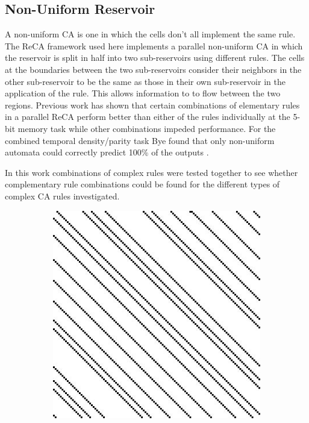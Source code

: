 \documentclass{elsarticle}
\begin{document}
\begin{multicols}{2}
\subsection{Non-Uniform Reservoir}
A non-uniform CA is one in which the cells don't all implement the same rule.  
    The ReCA framework used here implements a parallel non-uniform CA in which 
    the reservoir is split in half into two sub-reservoirs  using different 
    rules.  The cells at the boundaries between  the two sub-reservoirs 
    consider their neighbors in the other sub-reservoir to be the same as those 
    in their own sub-reservoir in the application of the rule. This allows 
    information to to flow between the two regions. Previous work has shown 
    that certain combinations of elementary rules in a parallel ReCA perform 
    better than either of the rules individually at the 5-bit memory task while 
    other combinations impeded performance\cite{nichele2017reservoir}. For the 
    combined temporal density/parity task Bye found that only non-uniform 
    automata could correctly predict 100\% of the outputs 
    \cite{bye2016investigation}.
  \par In this work combinations of complex rules were tested together to see 
  whether complementary rule combinations could be found for the different 
  types of complex CA rules investigated.     \begin{figure}[H]
\centering
\begin{subfigure}[]{0.475\linewidth}
  \includegraphics[width=\linewidth]{rule48.jpg}

\end{subfigure}
\end{figure}
\end{multicols}
\end{document}
